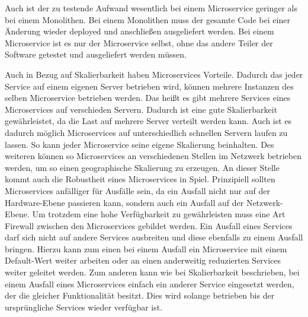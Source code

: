 Auch ist der zu testende Aufwand wesentlich bei einem Microservice geringer als bei einem Monolithen. Bei einem Monolithen muss der gesamte Code bei einer Änderung wieder deployed und anschließen ausgeliefert werden. Bei einem Microservice ist es nur der Microservice selbst, ohne das andere Teiler der Software getestet und ausgeliefert werden müssen.\cite{microservices}\newline\newline

Auch in Bezug auf Skalierbarkeit haben Microservices Vorteile. Dadurch das jeder Service auf einem eigenen Server betrieben wird, können mehrere Instanzen des selben Microservice betrieben werden. Das heißt es gibt mehrere Services eines Microservices auf verschieden Servern. Dadurch ist eine gute Skalierbarkeit gewährleistet, da die Last auf mehrere Server verteilt werden kann. Auch ist es dadurch möglich Microservices auf unterschiedlich schnellen Servern laufen zu lassen. So kann jeder Microservice seine eigene Skalierung beinhalten. Des weiteren können so Microservices an verschiedenen Stellen im Netzwerk betrieben werden, um so einen geographische Skalierung zu erzeugen.\newline 
An dieser Stelle kommt auch die Robustheit eines Microservices in Spiel. Prinzipiell sollten Microservices anfälliger für Ausfälle sein, da ein Ausfall nicht nur auf der Hardware-Ebene passieren kann, sondern auch ein Ausfall auf der Netzwerk-Ebene. Um trotzdem eine hohe Verfügbarkeit zu gewährleisten muss eine Art Firewall zwischen den Microservices gebildet werden. Ein Ausfall eines Services darf sich nicht auf andere Services ausbreiten und diese ebenfalls zu einem Ausfall bringen. Hierzu kann zum einen bei einem Ausfall ein Microservice mit einem Default-Wert weiter arbeiten oder an einen anderweitig reduzierten Services weiter geleitet werden. Zum anderen kann wie bei Skalierbarkeit beschrieben, bei einem Ausfall eines Microservices einfach ein anderer Service eingesetzt werden, der die gleicher Funktionalität besitzt. Dies wird solange betrieben bis der ursprüngliche Services wieder verfügbar ist.\cite{microservices}\newline\newline

